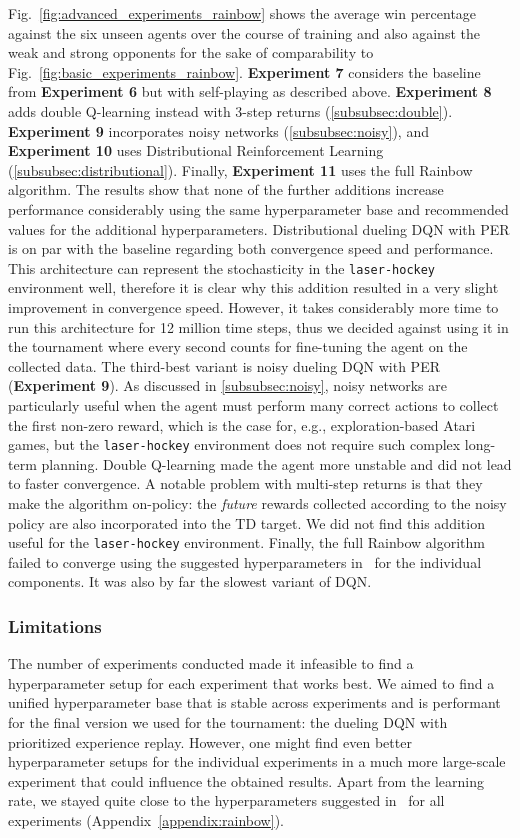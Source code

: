 Fig.~\ref{fig:advanced_experiments_rainbow} shows the average win percentage against the six unseen agents over the course of training and also against the weak and strong opponents for the sake of comparability to Fig.~\ref{fig:basic_experiments_rainbow}. \textbf{Experiment 7} considers the baseline from \textbf{Experiment 6} but with self-playing as described above. \textbf{Experiment 8} adds double Q-learning instead with 3-step returns (\ref{subsubsec:double}). \textbf{Experiment 9} incorporates noisy networks (\ref{subsubsec:noisy}), and \textbf{Experiment 10} uses Distributional Reinforcement Learning (\ref{subsubsec:distributional}). Finally, \textbf{Experiment 11} uses the full Rainbow algorithm. The results show that none of the further additions increase performance considerably using the same hyperparameter base and recommended values for the additional hyperparameters. Distributional dueling DQN with PER is on par with the baseline regarding both convergence speed and performance. This architecture can represent the stochasticity in the \texttt{laser-hockey} environment well, therefore it is clear why this addition resulted in a very slight improvement in convergence speed. However, it takes considerably more time to run this architecture for 12 million time steps, thus we decided against using it in the tournament where every second counts for fine-tuning the agent on the collected data. The third-best variant is noisy dueling DQN with PER (\textbf{Experiment 9}). As discussed in \ref{subsubsec:noisy}, noisy networks are particularly useful when the agent must perform many correct actions to collect the first non-zero reward, which is the case for, e.g., exploration-based Atari games, but the \texttt{laser-hockey} environment does not require such complex long-term planning. Double Q-learning made the agent more unstable and did not lead to faster convergence. A notable problem with multi-step returns is that they make the algorithm on-policy: the \emph{future} rewards collected according to the noisy policy are also incorporated into the TD target. We did not find this addition useful for the \texttt{laser-hockey} environment. Finally, the full Rainbow algorithm failed to converge using the suggested hyperparameters in~\cite{Hessel2018:Rainbow} for the individual components. It was also by far the slowest variant of DQN.

\subsubsection{Limitations}

The number of experiments conducted made it infeasible to find a hyperparameter setup for each experiment that works best. We aimed to find a unified hyperparameter base that is stable across experiments and is performant for the final version we used for the tournament: the dueling DQN with prioritized experience replay. However, one might find even better hyperparameter setups for the individual experiments in a much more large-scale experiment that could influence the obtained results. Apart from the learning rate, we stayed quite close to the hyperparameters suggested in~\cite{Hessel2018:Rainbow} for all experiments (Appendix~\ref{appendix:rainbow}).
